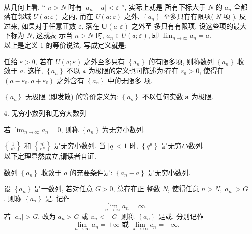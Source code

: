 \documentclass [t,12pt,mathserif] {beamer}
\begin{document}
\begin{frame}{}%
\\
从几何上看, “ $n>N$ 时有 $\left|a_n-a\right|<\varepsilon$ ”, 实际上就是 所有下标大于 $N$ 的 $a_n$ 全都落在邻域 $U(a ; \varepsilon)$ 之内, 而在 $U(a ; \varepsilon)$ 之外, $\left\{a_n\right\}$ 至多只有有限项( $N$ 项 ). 反过来, 如果对于任意正数 $\varepsilon$, 落在 $\boldsymbol{U}(a ; \varepsilon)$ 之外至 多只有有限项, 设这些项的最大下标为 $N$, 这就表 示当 $n>N$ 时, $a_n \in U(a ; \varepsilon)$, 即 $\lim _{n \rightarrow \infty} a_n=a$.  \\
以上是定义 1 的等价说法, 写成定义就是:\\
\begin{block}{} 
 任给 $\varepsilon>0$, 若在 $U(a ; \varepsilon)$ 之外至多只有 $\left\{a_n\right\}$ 的有限多项, 则称数列 $\left\{a_n\right\}$ 收敛于 $a$. 这样, $\left\{a_n\right\}$ 不以 $a$ 为极限的定义也可陈述为:存在 $\varepsilon_0>0$, 使得在 $\left(a-\varepsilon_0, a+\varepsilon_0\right)$ 之外含有 $\left\{a_n\right\}$ 中的无限多 项.
\end{block}

\end{frame}


\begin{frame}{}%
 \begin{alertblock}{}
 $\left\{a_n\right\}$ 无极限 (即发散) 的等价定义为: $\left\{a_n\right\}$ 不以任何实数 $\boldsymbol{a}$ 为极限.  
 \end{alertblock}  

\end{frame}


\begin{frame}{4. 无穷小数列和无穷大数列}%
\begin{dfn}
若 $\lim _{n \rightarrow \infty} a_n=0$, 则称 $\left\{a_n\right\}$ 为无穷小数列.
\end{dfn}    
 $\left\{\frac{1}{n^2}\right\}$ 和 $\left\{\frac{n !}{n^n}\right\}$ 是无穷小数列. 当 $|q|<1$ 时, $\left\{q^n\right\}$ 是无穷小数列.\\
以下定理显然成立,请读者自证.\\
\begin{thm}
数列 $\left\{a_n\right\}$ 收敛于 $a$ 的充要条件是: $\left\{a_n-a\right\}$ 是无穷小数列.
\end{thm} 
\end{frame}


\begin{frame}{}%
\begin{dfn}
设 $\left\{a_n\right\}$ 是一数列, 若对任意 $G>0$, 总存在正 整数 $N$, 使得任意 $n>N,\left|a_n\right|>G$, 则称 $\left\{a_n\right\}$ 是, 记作
$$
\lim _{n \rightarrow \infty} a_n=\infty \text {. }
$$
若 $\left|a_n\right|>G$, 改为 $a_n>G$ 或 $a_n<-G$, 则称 $\left\{a_n\right\}$ 是或, 分别记作
$$
\lim _{n \rightarrow \infty} a_n=+\infty \text { 或 } \lim _{n \rightarrow \infty} a_n=-\infty . 
$$  
\end{dfn}  
\end{frame}
\end{document}
